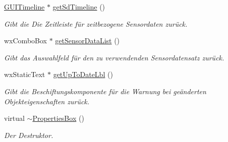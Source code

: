 \begin{DoxyCompactItemize}
\hyperlink{classGUITimeline}{G\-U\-I\-Timeline} $\ast$ \hyperlink{classPropertiesBox_a2f2f08b742f77e1d9adad98bc1d5753b}{get\-Sd\-Timeline} ()
\begin{DoxyCompactList}\small\item\em Gibt die Die Zeitleiste für zeitbezogene Sensordaten zurück. \end{DoxyCompactList}\item 
wx\-Combo\-Box $\ast$ \hyperlink{classPropertiesBox_a9c3c000011a8b66faf5965b26d696776}{get\-Sensor\-Data\-List} ()
\begin{DoxyCompactList}\small\item\em Gibt das Auswahlfeld für den zu verwendenden Sensordatensatz zurück. \end{DoxyCompactList}\item 
wx\-Static\-Text $\ast$ \hyperlink{classPropertiesBox_a5dadf68da6786bd09d4a882308e22e6f}{get\-Up\-To\-Date\-Lbl} ()
\begin{DoxyCompactList}\small\item\em Gibt die Beschiftungskomponente für die Warnung bei geänderten Objekteigenschaften zurück. \end{DoxyCompactList}\item 
virtual \hyperlink{classPropertiesBox_a45688be94b4b06f34125aebf5004e617}{$\sim$\-Properties\-Box} ()
\begin{DoxyCompactList}\small\item\em Der Destruktor. \end{DoxyCompactList}\end{DoxyCompactItemize}
